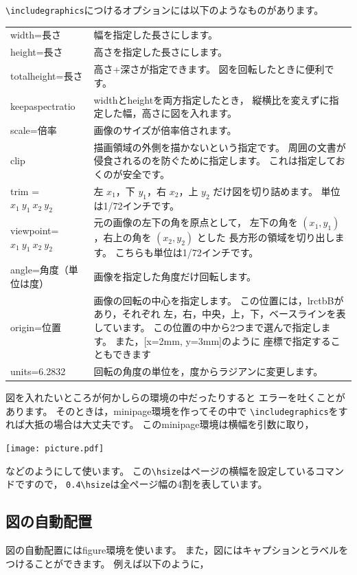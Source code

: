 \verb|\includegraphics|につけるオプションには以下のようなものがあります。

\begin{table}[H]
\label{tab:options-of-includegraphics}
\begin{center}
\begin{tabular}{lp{}}
width=長さ &
	幅を指定した長さにします。\tabularnewline
height=長さ &
	高さを指定した長さにします。\tabularnewline
totalheight=長さ &
	高さ+深さが指定できます。
	図を回転したときに便利です。\tabularnewline
keepaspectratio &
	widthとheightを両方指定したとき，
	縦横比を変えずに指定した幅，高さに図を入れます。\tabularnewline
scale=倍率 &
	画像のサイズが倍率倍されます。\tabularnewline
clip &
	描画領域の外側を描かないという指定です。
	周囲の文書が侵食されるのを防ぐために指定します。
	これは指定しておくのが安全です。\tabularnewline
trim = $x_1 \ y_1 \ x_2 \ y_2$ &
	左 $x_1$，下 $y_1$，右 $x_2$，上 $y_2$ だけ図を切り詰めます。
	単位は1/72インチです。\tabularnewline
viewpoint= $x_1 \ y_1 \ x_2 \ y_2$ &
	元の画像の左下の角を原点として，
	左下の角を $(x_1, y_1)$，右上の角を $(x_2, y_2)$ とした
	長方形の領域を切り出します。
	こちらも単位は1/72インチです。\tabularnewline
angle=角度（単位は度） &
	画像を指定した角度だけ回転します。\tabularnewline
origin=位置 &
	画像の回転の中心を指定します。
	この位置には，lrctbBがあり，それぞれ
	左，右，中央，上，下，ベースラインを表しています。
	この位置の中から2つまで選んで指定します。
	また，[x=2mm, y=3mm]のように
	座標で指定することもできます\tabularnewline
units=6.2832 &
	回転の角度の単位を，度からラジアンに変更します。
\end{tabular}
\end{center}
\end{table}

図を入れたいところが何かしらの環境の中だったりすると
エラーを吐くことがあります。
そのときは，minipage環境を作ってその中で
\verb|\includegraphics|をすれば大抵の場合は大丈夫です。
このminipage環境は横幅を引数に取り，
\begin{ITeX}
\begin{minipage}{0.4\hsize}
\texttt{[image: picture.pdf]}
\end{minipage}
\end{ITeX}
などのようにして使います。
この\verb|\hsize|はページの横幅を設定しているコマンドですので，
\verb|0.4\hsize|は全ページ幅の4割を表しています。


\subsection{図の自動配置}
\label{subsec:pictures-auto-distribution}
図の自動配置にはfigure環境を使います。
また，図にはキャプションとラベルをつけることができます。
例えば以下のように，

